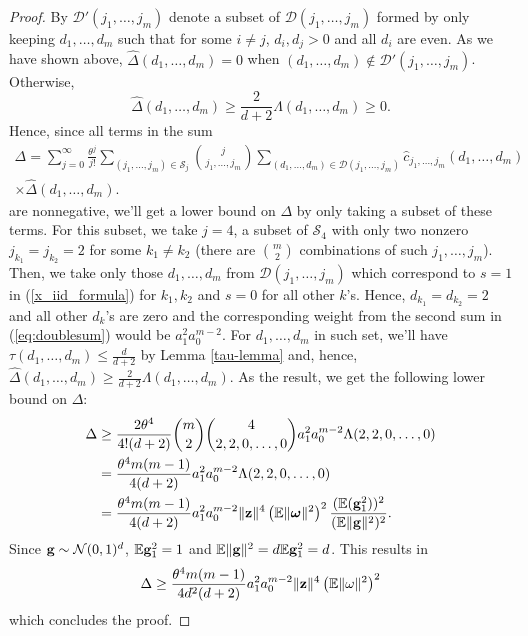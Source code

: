 \begin{proof}
By $\mathcal{D}' (j_1, \dots, j_m)$ denote a subset of $\mathcal{D} (j_1, \dots, j_m)$ formed by only keeping $d_1, \dots, d_m$ such that for some $i \neq j$, $d_i, d_j > 0$ and all $d_i$ are even. As we have shown above, $\widehat{\Delta}(d_{1},\dots,d_{m}) = 0$ when $(d_1, \dots, d_m) \notin \mathcal{D}' (j_1, \dots, j_m)$. Otherwise,
\begin{equation*}
    \widehat{\Delta}(d_{1},\dots,d_{m}) \geq \frac{2}{d + 2} \Lambda (d_{1},\dots,d_{m}) \geq 0 .
\end{equation*}
Hence, since all terms in the sum
\begin{gather}
\Delta = \sum_{j=0}^{\infty} \frac{\theta^{j}}{j!} \sum_{(j_{1},\dots,j_{m}) \in \mathcal{S}_{j}} \binom{j}{j_{1},\dots,j_{m}} \sum_{(d_{1},\dots,d_{m}) \in \mathcal{D}(j_{1},\dots,j_{m})} \widehat{c}_{j_1, \dots, j_m}(d_{1},\dots,d_{m}) \\
\times \widehat{\Delta}(d_{1},\dots,d_{m}). \label{eq:doublesum}
\end{gather}
are nonnegative, we'll get a lower bound on $\Delta$ by only taking a subset of these terms. For this subset, we take $j = 4$, a subset of $\mathcal{S}_4$ with only two nonzero $j_{k_1} = j_{k_2} = 2$ for some $k_1 \neq k_2$ (there are $\binom{m}{2}$ combinations of such $j_1, \dots, j_m$). Then, we take only those $d_1, \dots, d_m$ from $\mathcal{D} (j_1, \dots, j_m)$ which correspond to $s = 1$ in (\ref{x_iid_formula}) for $k_1, k_2$ and $s = 0$ for all other $k$'s. Hence, $d_{k_1} = d_{k_2} = 2$ and all other $d_k$'s are zero and the corresponding weight from the second sum in (\ref{eq:doublesum}) would be $a_1^2 a_0^{m - 2}$. For $d_1, \dots, d_m$ in such set, we'll have $\tau (d_1, \dots, d_m) \leq \frac{d}{d + 2}$ by Lemma \ref{tau-lemma} and, hence, $\widehat{\Delta}(d_{1},\dots,d_{m}) \geq \frac{2}{d + 2} \Lambda(d_{1},\dots,d_{m})$. As the result, we get the following lower bound on $\Delta$:
\begin{align*}
    \Delta &\geq \frac{2 \theta^4}{ 4! (d + 2)}  \binom{m}{2} \binom{4}{2, 2, 0, \dots, 0} a_1^2 a_0^{m - 2} \Lambda (2, 2, 0, \dots, 0) \\
    &= \frac{\theta^4 m (m - 1)}{4 (d + 2)} a_1^2 a_0^{m - 2} \Lambda(2, 2, 0, \dots, 0) \\
    &= \frac{\theta^4 m (m - 1)}{4 (d + 2)} a_1^2 a_0^{m - 2} \| \mathbf{z} \|^4 \left( \mathbb{E} \| \boldsymbol{\omega} \|^2 \right)^2 \frac{(\mathbb{E} (\mathbf{g}_1^2))^2}{(\mathbb{E} \| \mathbf{g} \|^2)^2} .
\end{align*}
Since $\mathbf{g} \sim \mathcal{N} (0, 1)^d$, $\mathbb{E} \mathbf{g}_1^2 = 1$ and $\mathbb{E} \| \mathbf{g} \|^2 = d \mathbb{E} \mathbf{g}_1^2 = d$. This results in
\begin{equation}
    \Delta \geq \frac{\theta^4 m (m - 1)}{4 d^2 (d + 2)} a_1^2 a_0^{m - 2} \| \mathbf{z} \|^4 \left( \mathbb{E} \| \omega \|^2 \right)^2 \label{eq:deltalb}
\end{equation}
which concludes the proof.


\end{proof}
